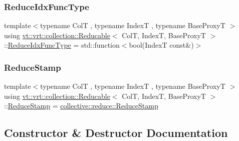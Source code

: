 \subsubsection{\texorpdfstring{Reduce\+Idx\+Func\+Type}{ReduceIdxFuncType}}
{\footnotesize\ttfamily template$<$typename ColT , typename IndexT , typename Base\+ProxyT $>$ \\
using \hyperlink{structvt_1_1vrt_1_1collection_1_1_reducable}{vt\+::vrt\+::collection\+::\+Reducable}$<$ ColT, IndexT, Base\+ProxyT $>$\+::\hyperlink{structvt_1_1vrt_1_1collection_1_1_reducable_a9f5a6c385efafe1fa52937f4809a9486}{Reduce\+Idx\+Func\+Type} =  std\+::function$<$bool(IndexT const\&)$>$}

\mbox{\label{structvt_1_1vrt_1_1collection_1_1_reducable_a19f80baf23f36dad4948ef07322fd0cb}} 
\subsubsection{\texorpdfstring{Reduce\+Stamp}{ReduceStamp}}
{\footnotesize\ttfamily template$<$typename ColT , typename IndexT , typename Base\+ProxyT $>$ \\
using \hyperlink{structvt_1_1vrt_1_1collection_1_1_reducable}{vt\+::vrt\+::collection\+::\+Reducable}$<$ ColT, IndexT, Base\+ProxyT $>$\+::\hyperlink{structvt_1_1vrt_1_1collection_1_1_reducable_a19f80baf23f36dad4948ef07322fd0cb}{Reduce\+Stamp} =  \hyperlink{namespacevt_1_1collective_1_1reduce_a7b7cb3021ac5654d92825d9fab0250b2}{collective\+::reduce\+::\+Reduce\+Stamp}}



\subsection{Constructor \& Destructor Documentation}
\mbox{\label{structvt_1_1vrt_1_1collection_1_1_reducable_a807b462380873448bfcf4661b4b28a2d}} 
